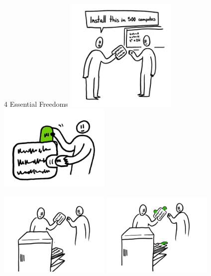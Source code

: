 \documentclass[pdf]{beamer}
\begin{document}
\begin{frame}{4 Essential Freedoms}
  \pause\hfill
  \includegraphics[width=0.4\textwidth]{freedom-0.png}
  \pause\hfill
  \includegraphics[width=0.4\textwidth]{freedom-1.png}
  \hfill

  \pause\hfill
  \includegraphics[width=0.4\textwidth]{freedom-2.png}
  \pause\hfill
  \includegraphics[width=0.4\textwidth]{freedom-3.png}
  \hfill
\end{frame}
\end{document}
